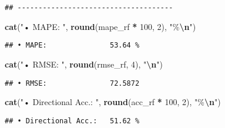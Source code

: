 \documentclass[
]{article}
\newenvironment{Shaded}{\begin{snugshade}}{\end{snugshade}}
\newcommand{\DecValTok}[1]{\textcolor[rgb]{0.00,0.00,0.81}{#1}}
\newcommand{\FunctionTok}[1]{\textcolor[rgb]{0.13,0.29,0.53}{\textbf{#1}}}
\newcommand{\NormalTok}[1]{#1}
\newcommand{\SpecialCharTok}[1]{\textcolor[rgb]{0.81,0.36,0.00}{\textbf{#1}}}
\newcommand{\StringTok}[1]{\textcolor[rgb]{0.31,0.60,0.02}{#1}}
\begin{document}
\begin{verbatim}
## -------------------------------------
\end{verbatim}

\begin{Shaded}
\begin{Highlighting}[]
\FunctionTok{cat}\NormalTok{(}\StringTok{"• MAPE:              "}\NormalTok{, }\FunctionTok{round}\NormalTok{(mape\_rf }\SpecialCharTok{*} \DecValTok{100}\NormalTok{, }\DecValTok{2}\NormalTok{), }\StringTok{"\%}\SpecialCharTok{\textbackslash{}n}\StringTok{"}\NormalTok{)}
\end{Highlighting}
\end{Shaded}

\begin{verbatim}
## • MAPE:               53.64 %
\end{verbatim}

\begin{Shaded}
\begin{Highlighting}[]
\FunctionTok{cat}\NormalTok{(}\StringTok{"• RMSE:              "}\NormalTok{, }\FunctionTok{round}\NormalTok{(rmse\_rf, }\DecValTok{4}\NormalTok{), }\StringTok{"}\SpecialCharTok{\textbackslash{}n}\StringTok{"}\NormalTok{)}
\end{Highlighting}
\end{Shaded}

\begin{verbatim}
## • RMSE:               72.5872
\end{verbatim}

\begin{Shaded}
\begin{Highlighting}[]
\FunctionTok{cat}\NormalTok{(}\StringTok{"• Directional Acc.:  "}\NormalTok{, }\FunctionTok{round}\NormalTok{(acc\_rf }\SpecialCharTok{*} \DecValTok{100}\NormalTok{, }\DecValTok{2}\NormalTok{), }\StringTok{"\%}\SpecialCharTok{\textbackslash{}n}\StringTok{"}\NormalTok{)}
\end{Highlighting}
\end{Shaded}

\begin{verbatim}
## • Directional Acc.:   51.62 %
\end{verbatim}

\begin{Shaded}
\end{Shaded}
\end{document}
